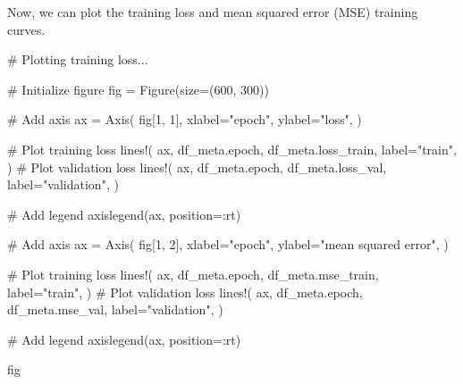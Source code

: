 \documentclass[
]{scrartcl}
\newenvironment{Shaded}{\begin{snugshade}}{\end{snugshade}}
\newcommand{\CommentTok}[1]{\textcolor[rgb]{0.37,0.37,0.37}{#1}}
\newcommand{\FloatTok}[1]{\textcolor[rgb]{0.68,0.00,0.00}{#1}}
\newcommand{\FunctionTok}[1]{\textcolor[rgb]{0.28,0.35,0.67}{#1}}
\newcommand{\NormalTok}[1]{\textcolor[rgb]{0.00,0.23,0.31}{#1}}
\newcommand{\OperatorTok}[1]{\textcolor[rgb]{0.37,0.37,0.37}{#1}}
\newcommand{\StringTok}[1]{\textcolor[rgb]{0.13,0.47,0.30}{#1}}
\begin{document}
Now, we can plot the training loss and mean squared error (MSE) training
curves.

\begin{Shaded}
\begin{Highlighting}[]
\CommentTok{\# Plotting training loss...}

\CommentTok{\# Initialize figure}
\NormalTok{fig }\OperatorTok{=} \FunctionTok{Figure}\NormalTok{(size}\OperatorTok{=}\NormalTok{(}\FloatTok{600}\NormalTok{, }\FloatTok{300}\NormalTok{))}

\CommentTok{\# Add axis}
\NormalTok{ax }\OperatorTok{=} \FunctionTok{Axis}\NormalTok{(}
\NormalTok{    fig[}\FloatTok{1}\NormalTok{, }\FloatTok{1}\NormalTok{],}
\NormalTok{    xlabel}\OperatorTok{=}\StringTok{"epoch"}\NormalTok{,}
\NormalTok{    ylabel}\OperatorTok{=}\StringTok{"loss"}\NormalTok{,}
\NormalTok{)}

\CommentTok{\# Plot training loss}
\FunctionTok{lines!}\NormalTok{(}
\NormalTok{    ax,}
\NormalTok{    df\_meta.epoch,}
\NormalTok{    df\_meta.loss\_train,}
\NormalTok{    label}\OperatorTok{=}\StringTok{"train"}\NormalTok{,}
\NormalTok{)}
\CommentTok{\# Plot validation loss}
\FunctionTok{lines!}\NormalTok{(}
\NormalTok{    ax,}
\NormalTok{    df\_meta.epoch,}
\NormalTok{    df\_meta.loss\_val,}
\NormalTok{    label}\OperatorTok{=}\StringTok{"validation"}\NormalTok{,}
\NormalTok{)}

\CommentTok{\# Add legend}
\FunctionTok{axislegend}\NormalTok{(ax, position}\OperatorTok{=:}\NormalTok{rt)}

\CommentTok{\# Add axis}
\NormalTok{ax }\OperatorTok{=} \FunctionTok{Axis}\NormalTok{(}
\NormalTok{    fig[}\FloatTok{1}\NormalTok{, }\FloatTok{2}\NormalTok{],}
\NormalTok{    xlabel}\OperatorTok{=}\StringTok{"epoch"}\NormalTok{,}
\NormalTok{    ylabel}\OperatorTok{=}\StringTok{"mean squared error"}\NormalTok{,}
\NormalTok{)}

\CommentTok{\# Plot training loss}
\FunctionTok{lines!}\NormalTok{(}
\NormalTok{    ax,}
\NormalTok{    df\_meta.epoch,}
\NormalTok{    df\_meta.mse\_train,}
\NormalTok{    label}\OperatorTok{=}\StringTok{"train"}\NormalTok{,}
\NormalTok{)}
\CommentTok{\# Plot validation loss}
\FunctionTok{lines!}\NormalTok{(}
\NormalTok{    ax,}
\NormalTok{    df\_meta.epoch,}
\NormalTok{    df\_meta.mse\_val,}
\NormalTok{    label}\OperatorTok{=}\StringTok{"validation"}\NormalTok{,}
\NormalTok{)}

\CommentTok{\# Add legend}
\FunctionTok{axislegend}\NormalTok{(ax, position}\OperatorTok{=:}\NormalTok{rt)}

\NormalTok{fig}
\end{Highlighting}
\end{Shaded}
\end{document}
